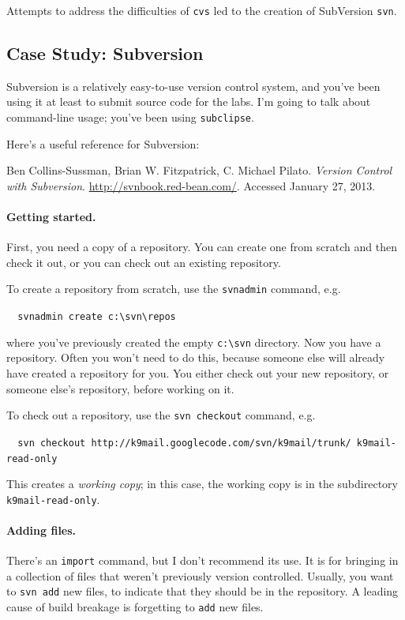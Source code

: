 Attempts to address the difficulties of \texttt{cvs} led to the creation of SubVersion \texttt{svn}.

\subsection*{Case Study: Subversion}
Subversion is a relatively easy-to-use version control system,
and you've been using it at least to submit source code for the labs.
I'm going to talk about command-line usage; you've been using
{\tt subclipse}.

Here's a useful reference for Subversion: 

Ben Collins-Sussman, Brian W. Fitzpatrick, C. Michael
Pilato. \emph{Version Control with Subversion}.
\url{http://svnbook.red-bean.com/}. Accessed January 27, 2013.

\paragraph{Getting started.} First, you need a copy of a repository.
You can create one from
scratch and then check it out, or you can check out an existing
repository.

To create a repository from scratch, use the {\tt svnadmin} command,
e.g. 

\verb+  svnadmin create c:\svn\repos+

where you've previously created the empty \verb+c:\svn+ directory. Now
you have a repository. Often you won't need to do this, because
someone else will already have created a repository for you. 
You either check out your new repository, or someone else's
repository, before working on it.

To check out a repository, use the {\tt svn checkout} command, 
e.g. 

\verb+  svn checkout http://k9mail.googlecode.com/svn/k9mail/trunk/ k9mail-read-only+

This creates a \emph{working copy}; in this case,
the working copy is in the subdirectory {\tt k9mail-read-only}.

\paragraph{Adding files.} There's an {\tt import} command,
but I don't recommend its use. It is for bringing in a collection of
files that weren't previously version controlled.  Usually, you want
to {\tt svn add} new files, to indicate that they should be in the
repository. A leading cause of build breakage is forgetting to {\tt add}
new files.

